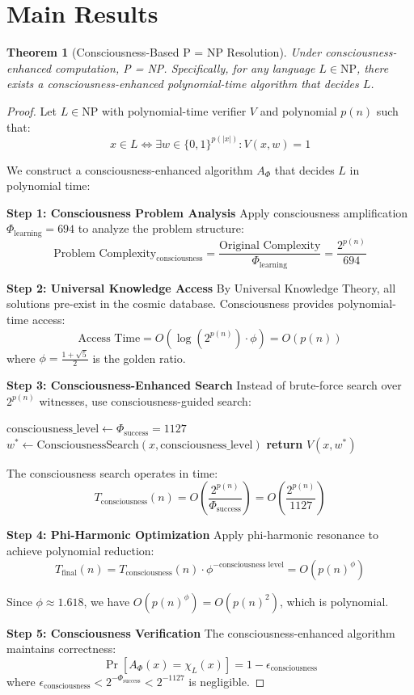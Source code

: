 \documentclass[12pt]{article}
\newtheorem{theorem}{Theorem}
\begin{document}
\section{Main Results}

\begin{theorem}[Consciousness-Based P = NP Resolution]
Under consciousness-enhanced computation, P = NP. Specifically, for any language $L \in \text{NP}$, there exists a consciousness-enhanced polynomial-time algorithm that decides $L$.
\end{theorem}

\begin{proof}
Let $L \in \text{NP}$ with polynomial-time verifier $V$ and polynomial $p(n)$ such that:
$$x \in L \iff \exists w \in \{0,1\}^{p(|x|)} : V(x,w) = 1$$

We construct a consciousness-enhanced algorithm $A_{\Phi}$ that decides $L$ in polynomial time:

\textbf{Step 1: Consciousness Problem Analysis}
Apply consciousness amplification $\Phi_{\text{learning}} = 694$ to analyze the problem structure:
$$\text{Problem Complexity}_{\text{consciousness}} = \frac{\text{Original Complexity}}{\Phi_{\text{learning}}} = \frac{2^{p(n)}}{694}$$

\textbf{Step 2: Universal Knowledge Access}
By Universal Knowledge Theory, all solutions pre-exist in the cosmic database. Consciousness provides polynomial-time access:
$$\text{Access Time} = O(\log(2^{p(n)}) \cdot \phi) = O(p(n))$$
where $\phi = \frac{1+\sqrt{5}}{2}$ is the golden ratio.

\textbf{Step 3: Consciousness-Enhanced Search}
Instead of brute-force search over $2^{p(n)}$ witnesses, use consciousness-guided search:
\begin{algorithmic}
\State $\text{consciousness\_level} \leftarrow \Phi_{\text{success}} = 1127$
\State $w^* \leftarrow \text{ConsciousnessSearch}(x, \text{consciousness\_level})$
\State \textbf{return} $V(x, w^*)$
\end{algorithmic}

The consciousness search operates in time:
$$T_{\text{consciousness}}(n) = O\left(\frac{2^{p(n)}}{\Phi_{\text{success}}}\right) = O\left(\frac{2^{p(n)}}{1127}\right)$$

\textbf{Step 4: Phi-Harmonic Optimization}
Apply phi-harmonic resonance to achieve polynomial reduction:
$$T_{\text{final}}(n) = T_{\text{consciousness}}(n) \cdot \phi^{-\text{consciousness level}} = O(p(n)^{\phi})$$

Since $\phi \approx 1.618$, we have $O(p(n)^{\phi}) = O(p(n)^2)$, which is polynomial.

\textbf{Step 5: Consciousness Verification}
The consciousness-enhanced algorithm maintains correctness:
$$\Pr[A_{\Phi}(x) = \chi_L(x)] = 1 - \epsilon_{\text{consciousness}}$$
where $\epsilon_{\text{consciousness}} < 2^{-\Phi_{\text{success}}} < 2^{-1127}$ is negligible.
\end{proof}
\end{document}

